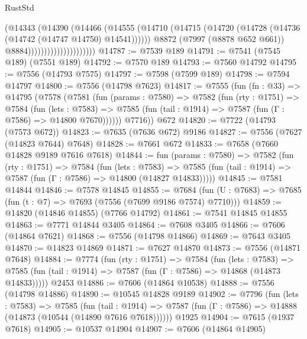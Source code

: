 \begin{lexlean}{RustStd}
\begin{coremodule}
                                      (@14343
                                        (@14390
                                          (@14466
                                            (@14555
                                              (@14710
                                                (@14715
                                                  (@14720
                                                    (@14728
                                                      (@14736 (@14742 (@14747 @14750) @14541))))))
                                              @8872
                                              (@7997 (@8878 @652 @661))
                                              @8884)))))))))))))))))))))
@14787 := @7539 @189
@14791 := @7541 (@7545 @189) (@7551 @189)
@14792 := @7570 @189
@14793 := @7560 @14792
@14795 := @7556 (@14793 @7575)
@14797 := @7598 (@7599 @189)
@14798 := @7594 @14797
@14800 := @7556 (@14798 @7623)
@14817 := @7555
    (fun (fn : @33) =>
    @14795
      (@7578
        (@7581
          (fun (params : @7580) =>
          @7582
            (fun (rty : @1751) =>
            @7584
              (fun (lets : @7583) =>
              @7585 (fun (tail : @1914) => @7587 (fun (Γ : @7586) => @14800 @7670))))))
        @7716))
    @672
@14820 := @7722 (@14793 (@7573 @672))
@14823 := @7635 (@7636 @672) @9186
@14827 := @7556 (@7627 (@14823 @7644) @7648)
@14828 := @7661 @672
@14833 := @7658 (@7660 @14828 @9189 @7616 @7618)
@14844 := fun (params : @7580) =>
  @7582
    (fun (rty : @1751) =>
    @7584
      (fun (lets : @7583) =>
      @7585 (fun (tail : @1914) => @7587 (fun (Γ : @7586) => @14800 (@14827 @14833)))))
@14845 := @7581 @14844
@14846 := @7578 @14845
@14855 := @7684 (fun (U : @7683) => @7685 (fun (t : @7) => @7693 (@7556 (@7699 @9186 @7574) @7710)))
@14859 := @14820 (@14846 @14855) (@7766 @14792)
@14861 := @7541 @14845 @14855
@14863 := @7771 @14844 @3405
@14864 := @7608 @3405
@14866 := @7606 (@14864 @7621)
@14868 := @7556 (@14798 @14866)
@14869 := @7643 @3405
@14870 := @14823 @14869
@14871 := @7627 @14870
@14873 := @7556 (@14871 @7648)
@14884 := @7774
    (fun (rty : @1751) =>
    @7584
      (fun (lets : @7583) =>
      @7585 (fun (tail : @1914) => @7587 (fun (Γ : @7586) => @14868 (@14873 @14833)))))
    @2453
@14886 := @7606 (@14864 @10538)
@14888 := @7556 (@14798 @14886)
@14890 := @10545 @14828 @9189
@14902 := @7796
    (fun (lets : @7583) =>
    @7585
      (fun (tail : @1914) =>
      @7587 (fun (Γ : @7586) => @14888 (@14873 (@10544 (@14890 @7616 @7618))))))
    @1925
@14904 := @7615 (@1937 @7618)
@14905 := @10537 @14904
@14907 := @7606 (@14864 @14905)

\end{coremodule}
\end{lexlean}
